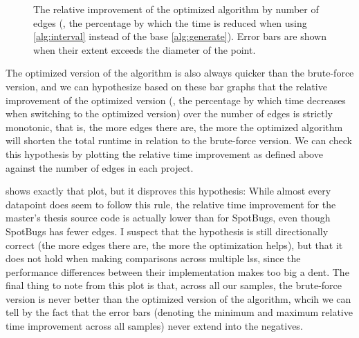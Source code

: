 \documentclass[../thesis]{subfiles}
\begin{document}
\begin{figure}
	\begin{center}
	\end{center}
	\caption{The relative improvement of the optimized algorithm by number of edges (\ie, the percentage by which the time is reduced when using \cref{alg:interval} instead of the base \cref{alg:generate}).
		Error bars are shown when their extent exceeds the diameter of the point.
	}\label{fig:relimprov}
\end{figure}

The optimized version of the algorithm is also always quicker than the brute-force version, and we can hypothesize based on these bar graphs that the relative improvement of the optimized version (\ie, the percentage by which time decreases when switching to the optimized version) over the number of edges is strictly monotonic, that is, the more edges there are, the more the optimized algorithm will shorten the total runtime in relation to the brute-force version.
We can check this hypothesis by plotting the relative time improvement as defined above against the number of edges in each project.

 shows exactly that plot, but it disproves this hypothesis:
While almost every datapoint does seem to follow this rule, the relative time improvement for the master's thesis source code is actually lower than for SpotBugs, even though SpotBugs has fewer edges.
I suspect that the hypothesis is still directionally correct (the more edges there are, the more the optimization helps), but that it does not hold when making comparisons across multiple \glspl{ls}, since the performance differences between their implementation makes too big a dent.
The final thing to note from this plot is that, across all our samples, the brute-force version is never better than the optimized version of the algorithm, whcih we can tell by the fact that the error bars (denoting the minimum and maximum relative time improvement across all samples) never extend into the negatives.
\end{document}
